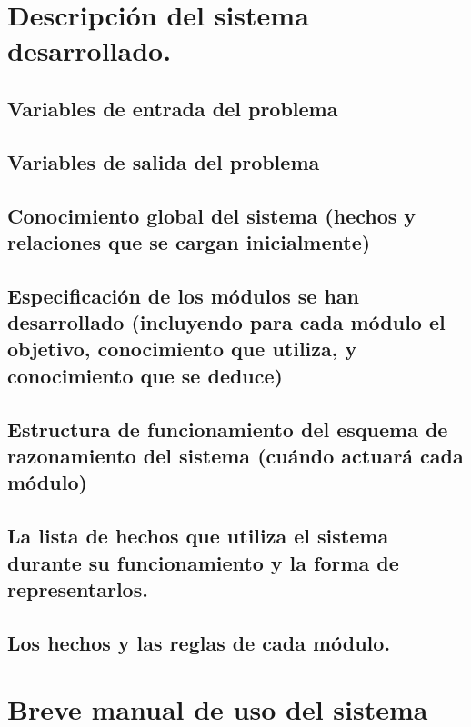 \documentclass[12pt]{article}
\begin{document}
\newpage
\section{Descripción del sistema desarrollado.}
\subsection{Variables de entrada del problema}
\subsection{Variables de salida del problema}
\subsection{Conocimiento global del sistema (hechos y relaciones que se cargan
	inicialmente)}
\subsection{Especificación de los módulos se han desarrollado (incluyendo para cada
módulo el objetivo, conocimiento que utiliza, y conocimiento que se deduce)}
\subsection{Estructura de funcionamiento del esquema de razonamiento del sistema
(cuándo actuará cada módulo)}
\subsection{La lista de hechos que utiliza el sistema durante su funcionamiento y la forma
de representarlos.}
\subsection{Los hechos y las reglas de cada módulo.}



\newpage
\section{Breve manual de uso del sistema}
\end{document}
